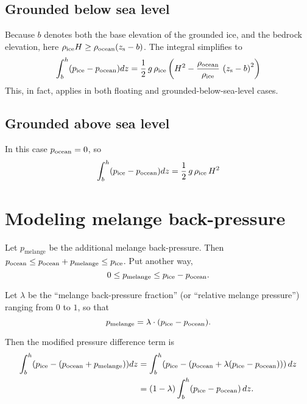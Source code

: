 \documentclass[11pt]{article}
\begin{document}
\subsection{Grounded below sea level}
\label{sec-5-2}

Because $b$ denotes both the base elevation of the grounded ice, and the bedrock elevation, here $\rho_{\text{ice}} H \ge \rho_{\text{ocean}} (z_{\text{s}} - b)$.  The integral simplifies to
\begin{equation*}
\int_{b}^{h}(p_{\text{ice}} - p_{\text{ocean}}) dz =
 \frac{1}{2}\, g\, \rho_{\text{ice}} \left(H^2-\frac{\rho_{\text{ocean}}}{\rho_{\text{ice}}}\, \left(z_{\text{s}}-b\right)^2\right)
\end{equation*}
This, in fact, applies in both floating and grounded-below-sea-level
cases.

\subsection{Grounded above sea level}
\label{sec-5-3}

In this case $p_{\text{ocean}} = 0$, so
\begin{equation*}
\int_{b}^{h}(p_{\text{ice}} - p_{\text{ocean}}) dz = \frac{1}{2}\, g\, \rho_{\text{ice}}\, H^2
\end{equation*}

\section{Modeling melange back-pressure}
\label{sec-6}

\newcommand{\pmelange}{p_{\text{melange}}}
Let $\pmelange$ be the additional melange back-pressure. Then $\psw \le \psw +
\pmelange \le \pice$. Put another way,
\begin{equation}
\label{eq:13}
0 \le \pmelange \le \pice - \psw.
\end{equation}

Let $\lambda$ be the ``melange back-pressure fraction'' (or ``relative
melange pressure'') ranging from $0$ to $1$, so that
\begin{equation}
\label{eq:14}
\pmelange = \lambda \cdot (\pice - \psw).
\end{equation}

Then the modified pressure difference term is
\begin{align}
\int_{b}^{h}(\pice - (\psw + \pmelange)) dz &= \int_{b}^{h}(\pice - (\psw + \lambda(\pice - \psw)))\, dz \notag
 \\
   &= (1 - \lambda) \int_{b}^{h} (\pice - \psw)\, dz.  \label{eq:15}
\end{align}


\small

\end{document}
